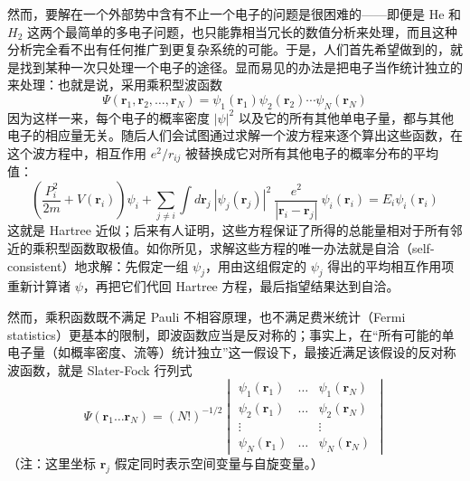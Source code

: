 然而，要解在一个外部势中含有不止一个电子的问题是很困难的——即便是 He 和 $H_2$ 这两个最简单的多电子问题，也只能靠相当冗长的数值分析来处理，而且这种分析完全看不出有任何推广到更复杂系统的可能。于是，人们首先希望做到的，就是找到某种一次只处理一个电子的途径。显而易见的办法是把电子当作统计独立的来处理：也就是说，采用乘积型波函数
\begin{equation*}
\Psi(\mathbf{r}_1,\mathbf{r}_2,\ldots,\mathbf{r}_N)=\psi_1(\mathbf{r}_1)\psi_2(\mathbf{r}_2)\cdots\psi_N(\mathbf{r}_N)
\end{equation*}
因为这样一来，每个电子的概率密度 $|\psi|^2$ 以及它的所有其他单电子量，都与其他电子的相应量无关。随后人们会试图通过求解一个波方程来逐个算出这些函数，在这个波方程中，相互作用 $e^2/r_{ij}$ 被替换成它对所有其他电子的概率分布的平均值：
\begin{equation*}
\left(\frac{P_i^2}{2m}+V(\mathbf{r}_i)\right)\psi_i+\sum_{j\neq i}\int d\mathbf{r}_j\ |\psi_j(\mathbf{r}_j)|^2\ \frac{e^2}{|\mathbf{r}_i-\mathbf{r}_j|}\ \psi_i(\mathbf{r}_i)=E_i\psi_i(\mathbf{r}_i)
\end{equation*}
这就是 Hartree 近似；后来有人证明，这些方程保证了所得的总能量相对于所有邻近的乘积型函数取极值。如你所见，求解这些方程的唯一办法就是自洽（self-consistent）地求解：先假定一组 $\psi_j$，用由这组假定的 $\psi_j$ 得出的平均相互作用项重新计算诸 $\psi$，再把它们代回 Hartree 方程，最后指望结果达到自洽。

然而，乘积函数既不满足 Pauli 不相容原理，也不满足费米统计（Fermi statistics）更基本的限制，即波函数应当是反对称的；事实上，在“所有可能的单电子量（如概率密度、流等）统计独立”这一假设下，最接近满足该假设的反对称波函数，就是 Slater-Fock 行列式
\begin{equation*}
\Psi(\mathbf{r}_1\ldots\mathbf{r}_N)=(N!)^{-1/2}
\begin{vmatrix}
\psi_1(\mathbf{r}_1) & \ldots & \psi_1(\mathbf{r}_N)\\
\psi_2(\mathbf{r}_1) & \ldots & \psi_2(\mathbf{r}_N)\\
\vdots & & \vdots\\
\psi_N(\mathbf{r}_1) & \ldots & \psi_N(\mathbf{r}_N)
\end{vmatrix}
\end{equation*}
（注：这里坐标 $\mathbf{r}_j$ 假定同时表示空间变量与自旋变量。）

